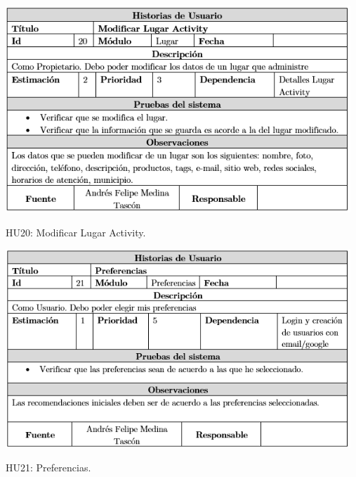 \documentclass[12pt,letterpaper,openany]{book}
\begin{document}
\begin{table}[H]
\centering
\includegraphics[width=13cm]{./imagenes/HU/HU20}
\caption{HU20: Modificar Lugar Activity.}
\end{table}

\begin{table}[H]
\centering
\includegraphics[width=13cm]{./imagenes/HU/HU21}
\caption{HU21: Preferencias.}
\end{table}

\end{document}
